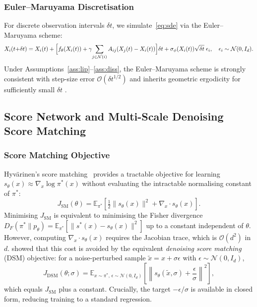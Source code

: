 \subsubsection{Euler--Maruyama Discretisation}

For discrete observation intervals $\delta t$, we simulate~\eqref{eq:sde}
via the Euler--Maruyama scheme:
\begin{equation}\label{eq:em}
X_i(t{+}\delta t)
= X_i(t)
  + \Bigl[f_\theta(X_i(t))
    + \gamma\!\sum_{j \in \mathcal{N}(i)} A_{ij}(X_j(t) - X_i(t))\Bigr]\delta t
  + \sigma_\phi(X_i(t))\sqrt{\delta t}\;\epsilon_i,
\quad \epsilon_i \sim \mathcal{N}(0, I_d).
\end{equation}
Under Assumptions~\ref{ass:lip}--\ref{ass:diss}, the Euler--Maruyama
scheme is strongly consistent with step-size error $\mathcal{O}(\delta t^{1/2})$
and inherits geometric ergodicity for sufficiently small $\delta t$
\citep{talay1990expansion}.

\subsection{Score Network and Multi-Scale Denoising Score Matching}
\label{sec:score}

\subsubsection{Score Matching Objective}

Hyv\"{a}rinen's score matching~\citep{Hyvarinen2005score} provides a tractable
objective for learning $s_\theta(x) \approx \nabla_x \log \pi^*(x)$ without
evaluating the intractable normalising constant of $\pi^*$:
\begin{equation}\label{eq:sm}
J_{\mathrm{SM}}(\theta)
= \mathbb{E}_{\pi^*}\!\left[
    \tfrac{1}{2}\|s_\theta(x)\|^2 + \nabla_x \cdot s_\theta(x)
  \right].
\end{equation}
Minimising $J_{\mathrm{SM}}$ is equivalent to minimising the Fisher
divergence $D_F(\pi^* \| p_\theta)
= \mathbb{E}_{\pi^*}[\|s^*(x) - s_\theta(x)\|^2]$
up to a constant independent of $\theta$.
However, computing $\nabla_x \cdot s_\theta(x)$ requires the Jacobian trace,
which is $\mathcal{O}(d^2)$ in $d$.
\citet{Vincent2011dsm} showed that this cost is avoided by the equivalent
\emph{denoising score matching} (DSM) objective: for a noise-perturbed
sample $\tilde{x} = x + \sigma\epsilon$ with $\epsilon \sim \mathcal{N}(0, I_d)$,
\begin{equation}\label{eq:dsm}
J_{\mathrm{DSM}}(\theta; \sigma)
= \mathbb{E}_{x \sim \pi^*,\, \epsilon \sim \mathcal{N}(0,I_d)}\!\left[
    \left\| s_\theta(\tilde{x}, \sigma) + \frac{\epsilon}{\sigma}
    \right\|^2
  \right],
\end{equation}
which equals $J_{\mathrm{SM}}$ plus a constant.
Crucially, the target $-\epsilon/\sigma$ is available in closed form,
reducing training to a standard regression.

